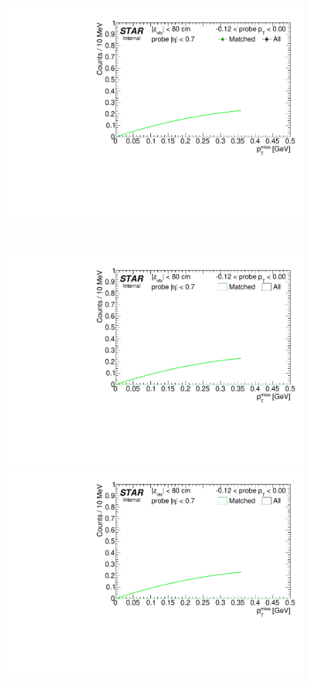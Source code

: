 \begin{figure}[h!]
{  \includegraphics[width=\linewidth,page=6]{graphics/systematicsEfficiency/TOF_tagAndProbe/Fitting_effVsPt_data.pdf}

}~
\parbox{0.495\textwidth}{
  \centering
\vspace{175pt}
  \includegraphics[width=\linewidth,page=5]{graphics/systematicsEfficiency/TOF_tagAndProbe/Fitting_effVsPt_mc.pdf}\\
  \includegraphics[width=\linewidth,page=6]{graphics/systematicsEfficiency/TOF_tagAndProbe/Fitting_effVsPt_mc.pdf}

}
\end{figure}
